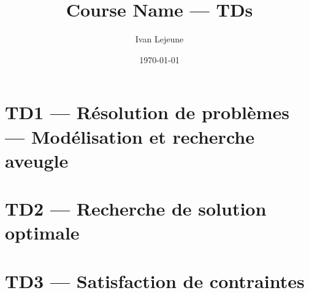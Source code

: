 \documentclass[french,a4paper,10pt]{article}
\title{\color{astral} \sffamily \bfseries Course Name --- TDs}
\author{Ivan Lejeune}
\date{\today}
\begin{document}
    \maketitle
    \tableofcontents

    \newpage
    \section*{TD1 --- Résolution de problèmes --- Modélisation et recherche aveugle}\label{sec:TD1}
    \setcounter{section}{1}
    \setcounter{tdcounter}{0}
    

    \newpage
    \section*{TD2 --- Recherche de solution optimale}\label{sec:TD2}
    \setcounter{section}{2}
    \setcounter{tdcounter}{0}
    

    \newpage
    \section*{TD3 --- Satisfaction de contraintes}\label{sec:TD3}
    \setcounter{section}{3}
    \setcounter{tdcounter}{0}
    


\end{document}
